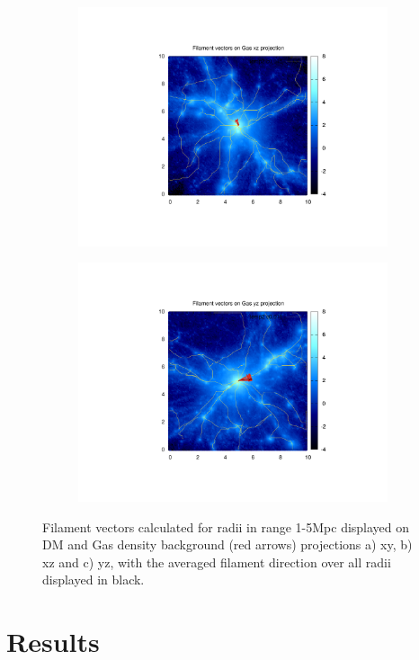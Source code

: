\documentclass[journal]{IEEEtran}
\begin{document}
\begin{figure}[!t]
\begin{subfigure}[t]{0.3\textwidth}
		\includegraphics[width=\linewidth]{FilxzGas}
	\end{subfigure}
	\quad
	\begin{subfigure}[t]{0.3\textwidth}
		\centering
		\includegraphics[width=\linewidth]{FilyzGas}
	\end{subfigure}
\label{fil_calc}
	\caption{Filament vectors calculated for radii in range 1-5Mpc displayed on DM and Gas density background (red arrows) projections a) xy, b) xz and c) yz, with the averaged filament direction over all radii displayed in black.}
\end{figure}

\section{Results}
\end{document}

